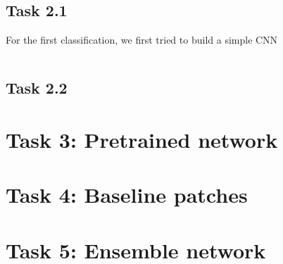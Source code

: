 \documentclass[11pt,a4paper,oneside]{article}
\begin{document}
\subsection{Task 2.1}
For the first classification, we first tried to build a simple CNN 

\begin{verbatim}

\end{verbatim}

\subsection{Task 2.2}


\section{Task 3: Pretrained network}


\section{Task 4: Baseline patches}


\section{Task 5: Ensemble network}
\end{document}
